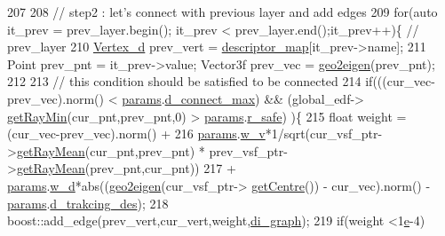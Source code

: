\begin{DoxyCode}
207             
208             \textcolor{comment}{// step2 : let's connect with previous layer and add edges }
209             \textcolor{keywordflow}{for}(\textcolor{keyword}{auto} it\_prev = prev\_layer.begin(); it\_prev < prev\_layer.end();it\_prev++)\{ \textcolor{comment}{// prev\_layer }
210                 \hyperlink{_common_8h_a1f671d518f573b692b5efa57ed576f36}{Vertex\_d} prev\_vert = \hyperlink{class_preplanner_a45603cfb24429584c4fc8bc42474e1ff}{descriptor\_map}[it\_prev->name];
211                 Point prev\_pnt = it\_prev->value; Vector3f prev\_vec = \hyperlink{_common_8h_a3e35de4eb7396984c2c5018768885d91}{geo2eigen}(prev\_pnt);
212 
213                 \textcolor{comment}{// this condition should be satisfied to be connected }
214                 \textcolor{keywordflow}{if}(((cur\_vec-prev\_vec).norm() < \hyperlink{class_preplanner_a679cc4b70f041aff73769e7ec92dc5d0}{params}.\hyperlink{structchaser_1_1_preplanner_params_a90021bd30b7e88b50cf9317ff3673482}{d\_connect\_max}) && (global\_edf->
      \hyperlink{struct_grid_field_af9f5144af2f0cdb99784ea54c42a8516}{getRayMin}(cur\_pnt,prev\_pnt,0) > \hyperlink{class_preplanner_a679cc4b70f041aff73769e7ec92dc5d0}{params}.\hyperlink{structchaser_1_1_preplanner_params_a409be3b01b1b4853919d5b34e529c49a}{r\_safe}) )\{
215                     \textcolor{keywordtype}{float} weight = (cur\_vec-prev\_vec).norm() + 
216                             \hyperlink{class_preplanner_a679cc4b70f041aff73769e7ec92dc5d0}{params}.\hyperlink{structchaser_1_1_preplanner_params_a1778793e5b16806c867291c1a5471a04}{w\_v}*1/sqrt(cur\_vsf\_ptr->\hyperlink{struct_grid_field_a3e49ca50129cb18db833bd4168c5d254}{getRayMean}(cur\_pnt,prev\_pnt) 
      * prev\_vsf\_ptr->\hyperlink{struct_grid_field_a3e49ca50129cb18db833bd4168c5d254}{getRayMean}(prev\_pnt,cur\_pnt)) 
217                             + \hyperlink{class_preplanner_a679cc4b70f041aff73769e7ec92dc5d0}{params}.\hyperlink{structchaser_1_1_preplanner_params_ae443edaa7e2912a6a7643272305c91f5}{w\_d}*abs((\hyperlink{_common_8h_a3e35de4eb7396984c2c5018768885d91}{geo2eigen}(cur\_vsf\_ptr->
      \hyperlink{struct_grid_field_aacd39f9388090694e5c428cc612fd887}{getCentre}()) - cur\_vec).norm() - \hyperlink{class_preplanner_a679cc4b70f041aff73769e7ec92dc5d0}{params}.\hyperlink{structchaser_1_1_preplanner_params_a6a950244cbb256abb9a4e93388c0177f}{d\_trakcing\_des});                     
218                     boost::add\_edge(prev\_vert,cur\_vert,weight,\hyperlink{class_preplanner_af588e8495d5e78dd5a746f7c640daa4d}{di\_graph});
219                     \textcolor{keywordflow}{if}(weight <1\hyperlink{namespace__setup__util_acdce690b925de33d6249bbbfa1109d61}{e}-4)

\end{DoxyCode}
